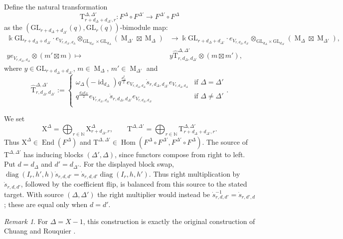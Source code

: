 \documentclass[12pt]{amsart}
\numberwithin{itemcounter}{subsection}
\theoremstyle{plain}
\theoremstyle{definition}
\theoremstyle{remark}
\newtheorem{remark}[theorem]{Remark}
\numberwithin{equation}{section}
\def\k{\Bbbk}
\def\GL{\mathrm{GL}}
\def\diag{\operatorname{diag}\nolimits}
\def\M{{\operatorname{M}\nolimits}}
\def\Hom{\operatorname{Hom}\nolimits}
\def\End{\operatorname{End}\nolimits}
\def\id{\operatorname{id}\nolimits}
\def\Hom{\operatorname{Hom}}
\def\End{{\operatorname{End}}}
\DeclareMathOperator*{\ot}{\otimes}
\begin{document}
Define the natural transformation
\[
\mathrm{T}_{r+d_\Delta+d_{\Delta'},r}^{\Delta,\Delta'}: F^\Delta \circ F^{\Delta'} \to F^{\Delta'} \circ F^\Delta
\]
as the $(\GL_{r+d_\Delta+d_{\Delta'}}(q), \GL_r(q))$-bimodule map:
\[
\begin{aligned}
    \k \GL_{r+d_\Delta+d_{\Delta'}}\cdot e_{V_{r,d_{\Delta'},d_\Delta}} \ot_{\GL_{d_{\Delta'}} \times \GL_{d_\Delta}} (\M_{\Delta'} \boxtimes \M_\Delta) &\to \k \GL_{r+d_\Delta+d_{\Delta'}}\cdot e_{V_{r,d_\Delta,d_{\Delta'}}} \ot_{\GL_{d_\Delta} \times \GL_{d_{\Delta'}}} (\M_\Delta \boxtimes \M_{\Delta'}), \\
    y e_{V_{r,d_{\Delta'},d_\Delta}} \ot (m' \boxtimes m) \mapsto & y \widehat{\mathrm{T}}^{\Delta,\Delta'}_{r,d_\Delta,d_{\Delta'}} \ot (m \boxtimes m'),
\end{aligned}
\]
where $y \in \GL_{r+d_\Delta+d_{\Delta'}}$, $m \in \M_\Delta$, $m'\in \M_{\Delta'}$ and
\[
\widehat{\mathrm{T}}^{\Delta,\Delta'}_{r,d_\Delta,d_{\Delta'}}:=\begin{cases}
    \omega_\Delta(-\id_{d_\Delta}) q^{\frac{d_\Delta ^2}{2}}  e_{V_{r,d_{\Delta},d_\Delta}} \dot{s}_{r,d_\Delta,d_{\Delta'}} e_{V_{r,d_{\Delta},d_\Delta}} & \text{if $\Delta=\Delta'$}\\
    q^{\frac{d_\Delta d_{\Delta'}}{2}}  e_{V_{r,d_{\Delta'},d_\Delta}} \dot{s}_{r,d_\Delta,d_{\Delta'}} e_{V_{r,d_\Delta,d_{\Delta'}}} & \text{if $\Delta\neq \Delta'$}\\

\end{cases}
.\]

We set
\[
\mathrm{X}^\Delta = \bigoplus_{r \in \mathbb{N}} \mathrm{X}^\Delta_{r+d_\Delta,r}, \qquad
\mathrm{T}^{\Delta,\Delta'} = \bigoplus_{r \in \mathbb{N}} \mathrm{T}^{\Delta,\Delta'}_{r+d_\Delta+d_{\Delta'},r}.
\]
Thus $\mathrm{X}^\Delta \in \End(F^\Delta)$ and $\mathrm{T}^{\Delta,\Delta'} \in \Hom(F^\Delta \circ F^{\Delta'}, F^{\Delta'} \circ F^\Delta)$.
The source of $\mathrm T^{\Delta,\Delta'}$ has inducing blocks
$(\Delta',\Delta)$, since functors compose from right to left.
Put $d=d_\Delta$ and $d'=d_{\Delta'}$.  For the displayed block swap,
$\diag(I_r,h',h)\dot s_{r,d,d'}=\dot s_{r,d,d'}\diag(I_r,h,h')$.
Thus right multiplication by $\dot s_{r,d,d'}$, followed by the coefficient
flip, is balanced from this source to the stated target.  With source
$(\Delta,\Delta')$ the right multiplier would instead be
$\dot s_{r,d,d'}^{-1}=\dot s_{r,d',d}$; these are equal only when $d=d'$.

\begin{remark}
For $\Delta=X-1$, this construction is exactly the original construction of
Chuang and Rouquier \cite{CR08}.
\end{remark}
\end{document}
